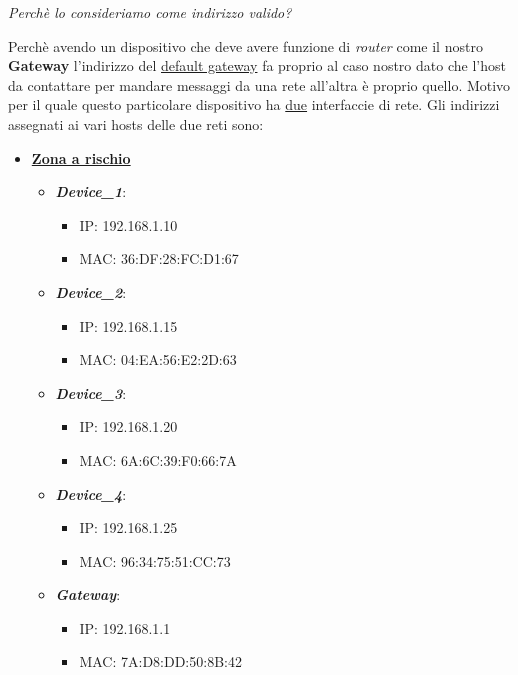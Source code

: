 \documentclass[a4paper,12pt]{report}
\begin{document}
\emph{Perchè lo consideriamo come indirizzo valido?}

Perchè avendo un dispositivo che deve avere funzione di \emph{router} come il nostro \textbf{Gateway} l'indirizzo del \underline{default gateway} fa proprio al caso nostro dato che l'host da contattare per mandare messaggi da una rete all'altra è proprio quello.
%
Motivo per il quale questo particolare dispositivo ha \underline{due} interfaccie di rete.
\newline
\newline
\newline
Gli indirizzi assegnati ai vari hosts delle due reti sono:
\begin{itemize}
    \item \textbf{\underline{Zona a rischio}}
    \begin{itemize}
        \item \emph{\textbf{Device\_1}}: 
        \begin{itemize}
            \item IP: 192.168.1.10
            \item MAC: 36:DF:28:FC:D1:67
        \end{itemize}
        \item \emph{\textbf{Device\_2}}: 
        \begin{itemize}
            \item IP: 192.168.1.15
            \item MAC: 04:EA:56:E2:2D:63
        \end{itemize}
        \item \emph{\textbf{Device\_3}}: 
        \begin{itemize}
            \item IP: 192.168.1.20
            \item MAC: 6A:6C:39:F0:66:7A
        \end{itemize}
        \item \emph{\textbf{Device\_4}}: 
        \begin{itemize}
            \item IP: 192.168.1.25
            \item MAC: 96:34:75:51:CC:73
        \end{itemize}
        \item \emph{\textbf{Gateway}}: 
        \begin{itemize}
            \item IP: 192.168.1.1
            \item MAC: 7A:D8:DD:50:8B:42

\end{itemize}
\end{itemize}
\end{itemize}
\end{document}

